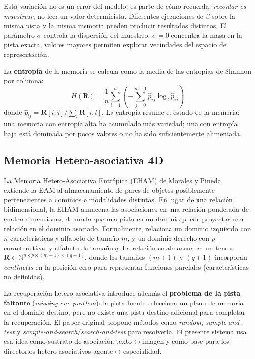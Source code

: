 Esta variación no es un error del modelo; es parte de cómo recuerda:
\emph{recordar es muestrear}, no leer un valor determinista.
Diferentes ejecuciones de $\beta$ sobre la misma pista y la misma memoria pueden producir
resultados distintos.
El parámetro $\sigma$ controla la dispersión del muestreo: $\sigma = 0$ concentra la
masa en la pista exacta, valores mayores permiten explorar vecindades del espacio de
representación.

La \textbf{entropía} de la memoria se calcula como la media de las entropías de Shannon
por columna:
\begin{equation}
    H(\mathbf{R}) = \frac{1}{n} \sum_{i=1}^{n} \left(-\sum_{j=0}^{m-1} \hat{p}_{ij} \log_2 \hat{p}_{ij}\right)
    \label{eq:entropia}
\end{equation}
donde $\hat{p}_{ij} = \mathbf{R}[i,j] / \sum_l \mathbf{R}[i,l]$.
La entropía resume el estado de la memoria: una memoria con entropía alta ha
acumulado más variedad; una con entropía baja está dominada por pocos valores
o no ha sido suficientemente alimentada.

\subsection{Memoria Hetero-asociativa 4D}
\label{sec:hetero4d}

La Memoria Hetero-Asociativa Entrópica (EHAM) de Morales y Pineda~\cite{morales2024hetero}
extiende la EAM al almacenamiento de pares de objetos posiblemente pertenecientes a dominios
o modalidades distintas.
En lugar de una relación bidimensional, la EHAM almacena las asociaciones en una relación
ponderada de cuatro dimensiones, de modo que una pista en un dominio puede proyectar una
relación en el dominio asociado.
Formalmente, relaciona un dominio izquierdo con $n$ características y alfabeto de tamaño $m$,
y un dominio derecho con $p$ características y alfabeto de tamaño $q$.
La relación se almacena en un tensor
$\mathbf{R} \in \mathbb{N}^{n \times p \times (m+1) \times (q+1)}$,
donde los tamaños $(m+1)$ y $(q+1)$ incorporan \emph{centinelas} en la posición cero
para representar funciones parciales (características no definidas).

La recuperación hetero-asociativa introduce además el \textbf{problema de la pista faltante}
(\emph{missing cue problem}): la pista fuente selecciona un plano de memoria en el dominio
destino, pero no existe una pista destino adicional para completar la recuperación.
El paper original propone métodos como \emph{random}, \emph{sample-and-test} y
\emph{sample-and-search}/\emph{search-and-test} para resolverlo.
El presente sistema usa esa idea como sustrato de asociación texto$\leftrightarrow$imagen y
como base para los directorios hetero-asociativos agente$\leftrightarrow$especialidad.

